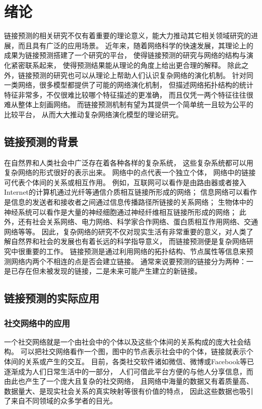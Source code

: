 
\chapter{绪论}
\label{chpt:introduction}

链接预测的相关研究不仅有着重要的理论意义，能大力推动其它相关领域研究的进展，而且具有广泛的应用场景。
近年来，随着网络科学的快速发展，其理论上的成果为链接预测搭建了一个研究的平台，
使得链接预测的研究与网络的结构与演化紧密联系起来，
使得预测结果能从理论的角度上给出更合理的解释。
除此之外，链接预测的研究也可以从理论上帮助人们认识复杂网络的演化机制。
针对同一类网络，很多模型都提供了可能的网络演化机制\cite{吕琳媛2010复杂网络链路预测}，
但描述网络拓扑结构的统计特征非常多，不仅很难比较哪个特征描述的更准确，
而且仅凭一两个特征往往很难从整体上刻画网络。
而链接预测机制有望为其提供一个简单统一且较为公平的比较平台，
从而大大推动复杂网络演化模型的理论研究。

\section{链接预测的背景}

在自然界和人类社会中广泛存在着各种各样的复杂系统，
这些复杂系统都可以用复杂网络的形式很好的表示出来。
网络中的点代表一个独立个体，
网络中的链接可代表个体间的关系或相互作用。
例如，互联网可以看作是由路由器或者接入Internet的计算机通过光纤等通信介质相互链接所形成的网络；
信息网络可以看作是信息的发送者和接收者之间通过信息传播路径所链接的关系网络；
生物体中的神经系统可以看作是大量的神经细胞通过神经纤维相互链接所形成的网络；
此外，还有社会关系网络、电力网络、科学家合作网络、蛋白质相互作用网络、交通网络等等。
因此，复杂网络的研究不仅对现实生活有非常重要的意义，对人类了解自然界和社会的发展也有着长远的科学指导意义，
而链接预测便是复杂网络研究中很重要的工作\cite{刘宏鲲2011利用链路预测推断网络演化机制}。
链接预测是通过利用网络的拓扑结构、节点属性等信息来预测网络内两个不相连的点是否会建立链接。
通常来说要预测的链接分为两种：一是已存在但未被发现的链接，二是未来可能产生建立的新链接\cite{李淑玲2012基于相似性的链接预测方法研究}\cite{wang2017novel}。


\section{链接预测的实际应用}
\subsection{社交网络中的应用}
\label{intro:sec:social}
一个社交网络就是一个由社会中的个体以及这些个体间的关系构成的庞大社会结构。
可以把社交网络看作一个图，图中的节点表示社会中的个体，链接就表示个体间的关系或产生的交互\cite{李淑玲2012基于相似性的链接预测方法研究}。
目前，各类社交软件诸如微信、微博或Facebook等已逐渐成为人们日常生活中的一部分，
人们可借此平台方便的与他人分享信息，而由此也产生了一个庞大且复杂的社交网络，
且网络中海量的数据又有着质量高、数据量大、是现实社会关系的真实映射等很有价值的特点，
因此这些数据也吸引了来自不同领域的众多学者的目光\cite{wang2015link}。

